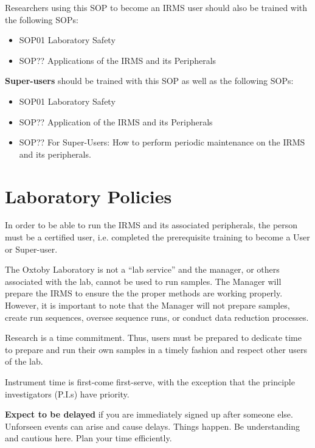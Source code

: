 \documentclass[12pt]{../SOP3}\usepackage[]{graphicx}\usepackage[]{color}
\begin{document}
\NP Researchers using this SOP to become an IRMS user should also be trained with the following SOPs:

\begin{itemize}
  \item SOP01 Laboratory Safety
  \item SOP?? Applications of the IRMS and its Peripherals
\end{itemize}

\NP \textbf{Super-users} should be trained with this SOP as well as the following SOPs:

\begin{itemize}
  \item SOP01 Laboratory Safety
  \item SOP?? Application of the IRMS and its Peripherals
  \item SOP?? For Super-Users: How to perform periodic maintenance on the IRMS and its peripherals. 
\end{itemize}

\section{Laboratory Policies}

\NP In order to be able to run the IRMS and its associated peripherals, the person must be a certified user, i.e. completed the prerequisite training to become a User or Super-user. 

\NP The Oxtoby Laboratory is not a ``lab service'' and the manager, or others associated with the lab, cannot be used to run samples. The Manager will prepare the IRMS to ensure the the proper methods are working properly. However, it is important to note that the Manager will not prepare samples, create run sequences, oversee sequence runs, or conduct data reduction processes. 

\NP Research is a time commitment. Thus, users must be prepared to dedicate time to prepare and run their own samples in a timely fashion and respect other users of the lab.

\NP Instrument time is first-come first-serve, with the exception that the principle investigators (P.I.s) have priority.

\NP \textbf{Expect to be delayed} if you are immediately signed up after someone else. Unforseen events can arise and cause delays. Things happen. Be understanding and cautious here. Plan your time efficiently.
\end{document}
